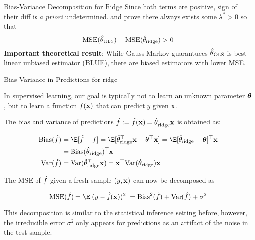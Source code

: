 \documentclass[11pt,compress,t,notes=noshow, xcolor=table]{beamer}
\begin{document}
\begin{vbframe}{Bias-Variance Decomposition for Ridge}
Since both terms are positive, sign of their diff is \textit{a priori} undetermined.  and  prove there always exists some $\lambda^{\ast}>0$ so that
$$\text{MSE}(\hat{\theta}_{\text{OLS}})-\text{MSE}(\hat{\theta}_{\text{ridge}})>0$$
\textbf{Important theoretical result}: While Gauss-Markov guarantuees $\hat{\theta}_{\text{OLS}}$ is best linear unbiased estimator (BLUE), there are biased estimators with lower MSE.

\end{vbframe}

\begin{vbframe}{Bias-Variance in Predictions for ridge}

In supervised learning, our goal is typically not to learn an unknown parameter $\bm{\theta}$, but to learn a function $f(\mathbf{x})$ that can predict $y$ given $\mathbf{x}$.

\vspace{0.2cm}

The bias and variance of predictions $\hat{f}:=\hat{f}(\mathbf{x})=\hat{\theta}_{\text{ridge}}^{\top} \mathbf{x}$ is obtained as:

\begin{align*}
\text{Bias}(\fh)&=\E[\hat{f}-f]=\E[\thetah_{\text{ridge}}^{\top} \xv - \thetav^{\top} \xv]=\E[\thetah_{\text{ridge}}-\thetav]^{\top} \xv\\ 
&= \text{Bias}(\thetah_{\text{ridge}})^{\top} \xv \\
\text{Var}(\fh)&=\text{Var}(\thetah_{\text{ridge}}^{\top} \xv) = \xv^{\top} \text{Var}(\thetah_{\text{ridge}}) \xv
\end{align*}

The MSE of $\hat{f}$ given a fresh sample $(y,\mathbf{x})$ can now be decomposed as

$$\text{MSE}(\fh)=\E[(y-\fh(\xv))^2]=\text{Bias}^{2}(\fh) + \text{Var}(\fh) + \sigma^2$$

This decomposition is similar to the statistical inference setting before, however, the irreducible error $\sigma^2$ only appears for predictions as an artifact
of the noise in the test sample.

\end{vbframe}


\endlecture
\end{document}
